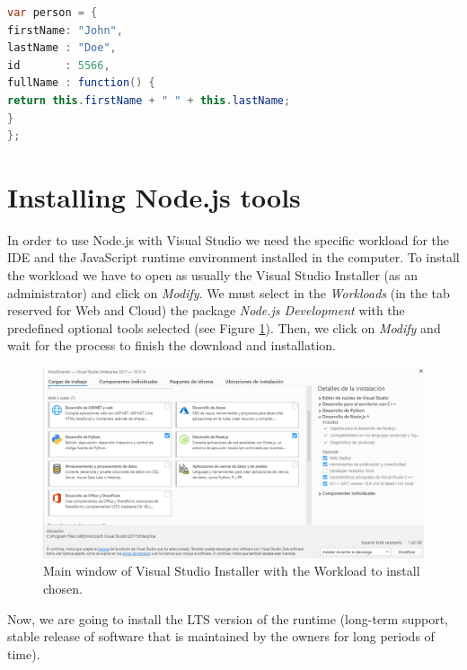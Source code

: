 \begin{lstlisting}[language=Java, caption={Example of object called ``person'', declared containing both properties and a method.}, label={lst:JS2}]
var person = {
firstName: "John",
lastName : "Doe",
id       : 5566,
fullName : function() {
return this.firstName + " " + this.lastName;
}
};
\end{lstlisting}




    \FloatBarrier
    \section{Installing Node.js tools}

In order to use Node.js with Visual Studio we need the specific workload for the IDE and the JavaScript runtime environment installed in the computer. To install the workload we have to open as usually the Visual Studio Installer (as an administrator) and click on \textit{Modify}. We must select in the \textit{Workloads} (in the tab reserved for Web and Cloud) the package \textit{Node.js Development} with the predefined optional tools selected (see Figure \ref{fig:Node}). Then, we click on \textit{Modify} and wait for the process to finish the download and installation.

\begin{figure}
    \centering
    \includegraphics[width= \textwidth]{Figures/Projects/Node}
    \caption{Main window of Visual Studio Installer with the Workload to install chosen.}
    \label{fig:Node}
\end{figure}

Now, we are going to install the LTS version of the runtime (long-term support, stable release of software that is maintained by the owners for long periods of time).

